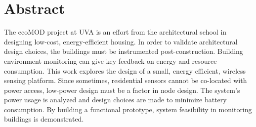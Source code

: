 \chapter{Abstract}

The ecoMOD project at UVA is an effort from the architectural school in designing low-cost, energy-efficient housing. In order to validate architectural design choices, the buildings must be instrumented post-construction. Building environment monitoring can give key feedback on energy and resource consumption. This work explores the design of a small, energy efficient, wireless sensing platform. Since sometimes, residential sensors cannot be co-located with power access, low-power design must be a factor in node design. The system's power usage is analyzed and design choices are made to minimize battery consumption. By building a functional prototype, system feasibility in monitoring buildings is demonstrated.